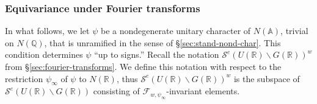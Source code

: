 \subsubsection{Equivariance under Fourier transforms}
In what follows, we let $\psi$ be a nondegenerate unitary character of $N(\mathbb{A})$, trivial on $N(\mathbb{Q})$, that is unramified in the sense of \S\ref{sec:stand-nond-char}.  This condition determines $\psi$ ``up to signs.''  Recall the notation $\mathcal{S}^e(U(\mathbb{R}) \backslash G(\mathbb{R}))^w$ from \S\ref{sec:fourier-transforms}.  We define this notation with respect to the restriction $\psi_{\infty}$ of $\psi$ to $N(\mathbb{R})$, thus $\mathcal{S}^e(U(\mathbb{R}) \backslash G(\mathbb{R}))^w$ is the subspace of $\mathcal{S}^e(U(\mathbb{R}) \backslash G(\mathbb{R}))$  consisting of $\mathcal{F}_{w,\psi_\infty}$-invariant elements.

